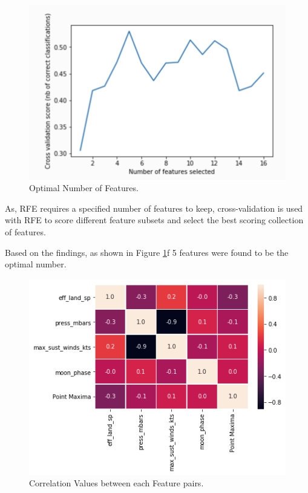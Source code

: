 \documentclass[letterpaper, 10 pt, conference]{ieeeconf}  %
\begin{document}
\begin{figure}[h!]
  \includegraphics[width=\linewidth]{optimal_feat.png}
  \caption{Optimal Number of Features.}
  \label{fig:optimal_feat}
\end{figure}

As, RFE requires a specified number of features to keep, cross-validation is used with RFE to score different feature subsets and select the best scoring collection of features.

Based on the findings, as shown in Figure \ref{fig:optimal_feat}f 5 features were found to be the optimal number.

\begin{figure}[h!]
  \includegraphics[width=\linewidth]{corr.png}
  \caption{Correlation Values between each Feature pairs.}
  \label{fig:corr}
\end{figure}
\end{document}
